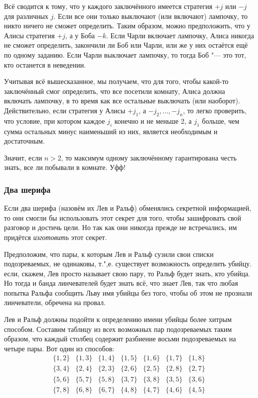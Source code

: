 \documentclass[twoside]{book}
\begin{document}
Всё сводится к тому, что у каждого заключённого имеется стратегия $+j$ или $-j$ для различных $j$.
Если все они только выключают (или включают) лампочку, то никто ничего не сможет определить.
Таким образом, можно предположить, что у Алисы стратегия $+j$, а у Боба  $-k$.
Если Чарли включает лампочку, Алиса никогда не сможет определить, закончили ли Боб или Чарли, или же у них остаётся ещё по одному заданию.
Если Чарли выключает лампочку, то тогда Боб "--- это тот, кто останется в неведении.

Учитывая всё вышесказанное, мы получаем, что для того, чтобы какой-то заключённый смог определить, что все посетили комнату,
Алиса должна включать лампочку, в то время как все остальные выключать (или наоборот).
Действительно, если стратегия у Алисы $+j_1$, а   $-j_2,\dots,-j_n$, то легко проверить, что условие, при котором каждое $j_i$ конечно и не меньше 2, а $j_1$ больше, чем сумма остальных минус наименьший из них, является необходимым и достаточным.

Значит, если $n>2$, то максимум одному заключённому гарантирована честь знать, все ли побывали в комнате.
Уфф!

\subsubsection*{Два шерифа}%

Если  два шерифа (назовём их Лев и Ральф) обменялись секретной информацией, то они смогли бы использовать этот секрет для того, чтобы зашифровать свой разговор и достичь цели.
Но так как они никогда прежде не встречались, им придётся \emph{изготовить} этот секрет.


Предположим, что пары, к которым Лев и Ральф сузили свои списки подозреваемых, не одинаковы, т.",е. существует возможность определить убийцу.
 если, скажем, Лев просто называет свою пару, то Ральф будет знать, кто убийца.
Но тогда и банда линчевателей будет знать всё, что знает Лев, так что любая попытка Ральфа сообщить Льву имя убийцы без того, чтобы об этом не прознали линчеватели, обречена на провал.

Лев и Ральф должны подойти к определению имени убийцы более хитрым способом.
Составим таблицу из всех возможных пар подозреваемых таким образом, что каждый столбец содержит разбиение восьми подозреваемых на четыре пары.
Вот один из способов:
\[
\begin{matrix}
\{1,2\}&\{1,3\}&\{1,4\}&\{1,5\}&\{1,6\}&\{1,7\}&\{1,8\}
\\
\{3,4\}&\{2,4\}&\{2,3\}&\{2,6\}&\{2,5\}&\{2,8\}&\{2,7\}
\\
\{5,6\}&\{5,7\}&\{5,8\}&\{3,7\}&\{3,8\}&\{3,5\}&\{3,6\}
\\
\{7,8\}&\{6,8\}&\{6,7\}&\{4,8\}&\{4,7\}&\{4,6\}&\{4,5\}
\end{matrix}
\]
\end{document}

